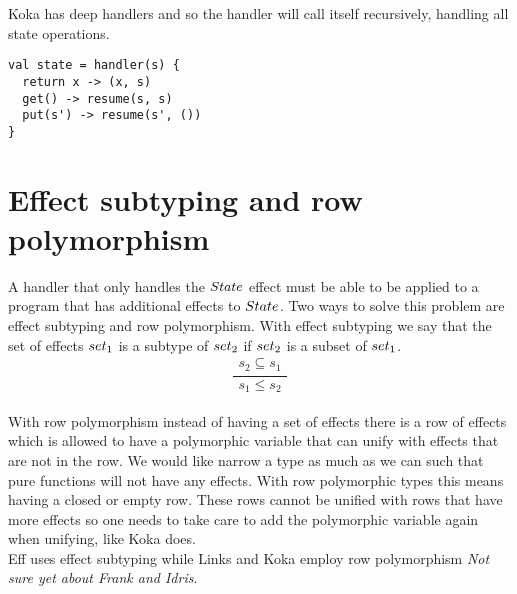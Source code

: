 \documentclass[12pt]{article}
\begin{document}
Koka has deep handlers and so the handler will call itself recursively, handling all state operations.
\begin{lstlisting}
val state = handler(s) {
  return x -> (x, s)
  get() -> resume(s, s)
  put(s') -> resume(s', ())
}
\end{lstlisting}


\section{Effect subtyping and row polymorphism}
A handler that only handles the $\mathnormal{State}$ effect must be able to be applied to a program that has additional effects to $\mathnormal{State}$. Two ways to solve this problem are effect subtyping and row polymorphism. With effect subtyping we say that the set of effects $\mathnormal{set}_1$ is a subtype of $\mathnormal{set}_2$ if
$\mathnormal{set}_2$ is a subset of $\mathnormal{set}_1$. \\
 \[\frac{
	\begin{array}{l}
	s_2 \subseteq s_1
	\end{array}
}{
	s_1 \leq s_2
}\]\\
With row polymorphism instead of having a set of effects there is a row of effects which is allowed to have a polymorphic variable that can unify with effects that are not in the row.
We would like narrow a type as much as we can such that pure functions will not have any effects. With row polymorphic types this means having a closed or empty row. These rows cannot be unified with rows that have more effects so one needs to take care to add the polymorphic variable again when unifying, like Koka does.\\
Eff uses effect subtyping while Links and Koka employ row polymorphism \textit{Not sure yet about Frank and Idris}.
\end{document}
